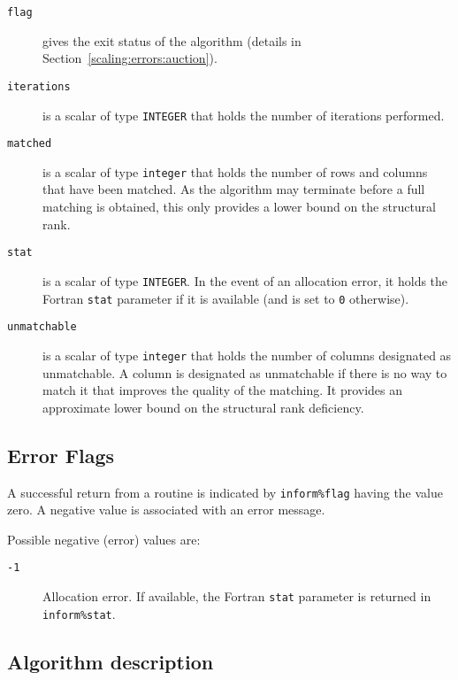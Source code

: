 \begin{description}

\item[\texttt{flag}] gives the exit status of the algorithm (details in Section~\ref{scaling:errors:auction}).

\item[\texttt{iterations}] is a scalar of type \texttt{INTEGER} that holds the number of iterations performed.

\item[\texttt{matched}] is a scalar of type \texttt{integer} that holds the number of rows and columns that have been matched. As the algorithm may terminate before a full matching is obtained, this only provides a lower bound on the structural rank.

\item[\texttt{stat}] is a scalar of type \texttt{INTEGER}. In the event of an allocation error, it holds the Fortran \texttt{stat} parameter if it is available (and is set to \texttt{0} otherwise).

\item[\texttt{unmatchable}] is a scalar of type \texttt{integer} that holds the number of columns designated as unmatchable. A column is designated as unmatchable if there is no way to match it that improves the quality of the matching. It provides an approximate lower bound on the structural rank deficiency.

\end{description}

\subsection{Error Flags} \label{secaling:errors:auction}
A successful return from a routine is indicated by \texttt{inform\%flag} having the value zero. A negative value is associated with an error message.

Possible negative (error) values are:
\begin{description}
\item[\texttt{-1}] Allocation error. If available, the Fortran \texttt{stat} parameter is returned in \texttt{inform\%stat}.
\end{description}

\subsection{Algorithm description} \label{scaling:method:auction}

